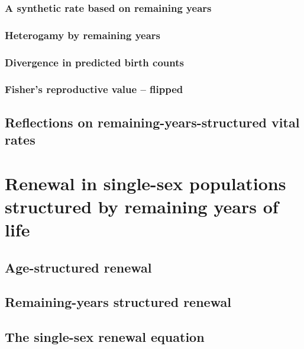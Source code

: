     \subsection{A synthetic rate based on remaining years}
      
    
    \subsection{Heterogamy by remaining years}
      
      
    \subsection{Divergence in predicted birth counts}
      
    \subsection{Fisher's reproductive value -- flipped}
      
  \section{Reflections on remaining-years-structured vital rates}
      

  \chapter{Renewal in single-sex populations structured by remaining years of
life}
    
    \section{Age-structured renewal}
      
    \section{Remaining-years structured renewal}
      
    \section{The single-sex renewal equation}
      
